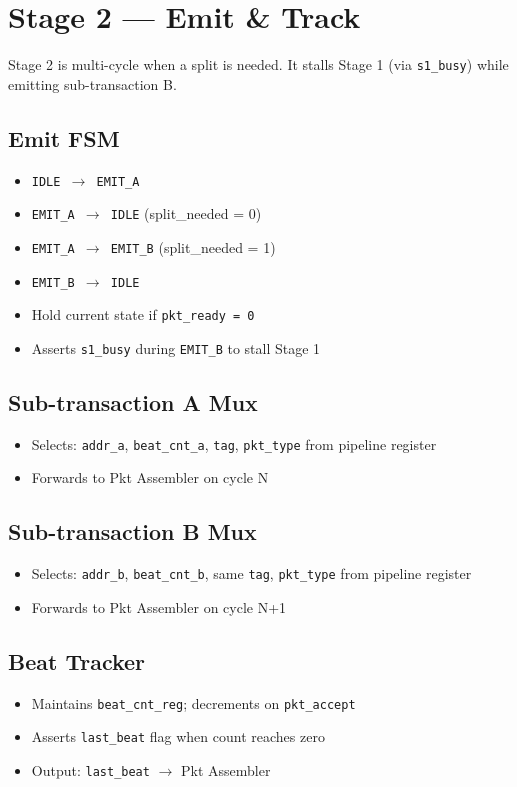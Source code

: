\documentclass[11pt]{article}
\begin{document}
\section{Stage 2 --- Emit \& Track}

Stage 2 is multi-cycle when a split is needed. It stalls Stage 1 (via \texttt{s1\_busy}) while emitting sub-transaction B.

\subsection{Emit FSM}

\begin{itemize}[noitemsep]
  \item \texttt{IDLE $\rightarrow$ EMIT\_A}
  \item \texttt{EMIT\_A $\rightarrow$ IDLE} \hfill (split\_needed = 0)
  \item \texttt{EMIT\_A $\rightarrow$ EMIT\_B} \hfill (split\_needed = 1)
  \item \texttt{EMIT\_B $\rightarrow$ IDLE}
  \item Hold current state if \texttt{pkt\_ready = 0}
  \item Asserts \texttt{s1\_busy} during \texttt{EMIT\_B} to stall Stage 1
\end{itemize}

\subsection{Sub-transaction A Mux}
\begin{itemize}[noitemsep]
  \item Selects: \texttt{addr\_a}, \texttt{beat\_cnt\_a}, \texttt{tag}, \texttt{pkt\_type} from pipeline register
  \item Forwards to Pkt Assembler on cycle N
\end{itemize}

\subsection{Sub-transaction B Mux}
\begin{itemize}[noitemsep]
  \item Selects: \texttt{addr\_b}, \texttt{beat\_cnt\_b}, same \texttt{tag}, \texttt{pkt\_type} from pipeline register
  \item Forwards to Pkt Assembler on cycle N+1
\end{itemize}

\subsection{Beat Tracker}
\begin{itemize}[noitemsep]
  \item Maintains \texttt{beat\_cnt\_reg}; decrements on \texttt{pkt\_accept}
  \item Asserts \texttt{last\_beat} flag when count reaches zero
  \item Output: \texttt{last\_beat} $\rightarrow$ Pkt Assembler
\end{itemize}
\end{document}

